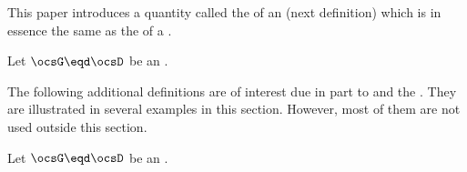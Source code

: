 This paper introduces a quantity called the  of an  (next definition)
which is in essence the same as the  of a  .
\begin{definition}
\label{def:ocscen}
Let $\ocsG\eqd\ocsD$ be an  .
\\
\end{definition}

The following additional definitions are of interest due in part to 
 and the  .
They are illustrated in several examples in this section.
However, %
most of them are not used outside this section.
\begin{definition}
\label{def:ocscena}
\label{def:ocsceng}
\label{def:ocscenh}
\label{def:ocscenm}
\label{def:ocscenM}
\label{def:ocscenx}
Let $\ocsG\eqd\ocsD$ be an  .
\\
\end{definition}

